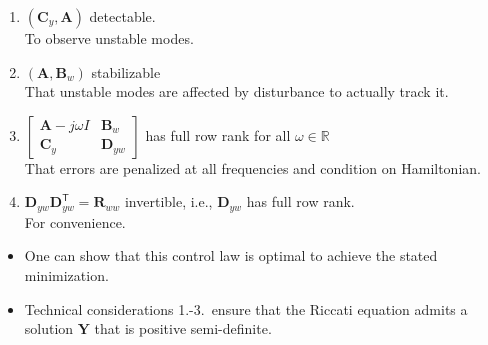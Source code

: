 \newpar{}

\begin{enumerate}
    \item $(\mathbf{C}_y,\mathbf{A})$ detectable.\\
          To observe unstable modes.
    \item $(\mathbf{A},\mathbf{B}_w)$ stabilizable\\
          That unstable modes are affected by disturbance to actually track it.
    \item $\begin{bmatrix}\mathbf{A}-j\omega I&\mathbf{B}_w\\\mathbf{C}_y&\mathbf{D}_{yw}\end{bmatrix}$ has full row rank for all $\omega\in\mathbb{R}$\\
          That errors are penalized at all frequencies and condition on Hamiltonian.
    \item $\mathbf{D}_{yw} \mathbf{D}_{yw}^{\mathsf{T}}=\mathbf{R}_{ww}$ invertible, i.e., $\mathbf{D}_{yw}$ has full row rank.\\
          For convenience.
\end{enumerate}


\begin{itemize}
    \item One can show that this control law is optimal to achieve the stated minimization.
    \item Technical considerations 1.-3.\ ensure that the Riccati equation admits a solution $\mathbf{Y}$ that is positive semi-definite.
\end{itemize}

